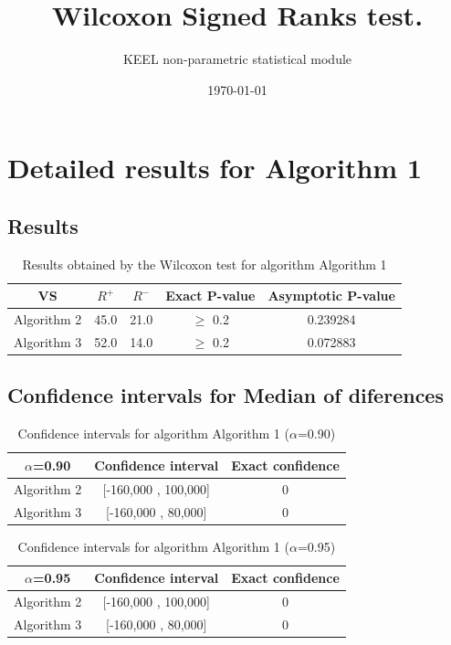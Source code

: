 \documentclass[a4paper,10pt]{article}
\title{Wilcoxon Signed Ranks test.}
\date{\today}
\author{KEEL non-parametric statistical module}
\begin{document}
\pagestyle{empty}
\maketitle
\thispagestyle{empty}



\section{Detailed results for Algorithm 1}


\subsection{Results}

\begin{table}[!htp]
\centering\small
\begin{tabular}{
|c|c|c|c|c|}
\hline
 VS & $R^{+}$ & $R^{-}$ & Exact P-value & Asymptotic P-value \\ \hline 
Algorithm 2 & 45.0 & 21.0 & $\geq$ 0.2 & 0.239284\\ \hline 
Algorithm 3 & 52.0 & 14.0 & $\geq$ 0.2 & 0.072883\\ \hline 

\end{tabular}
\caption{Results obtained by the Wilcoxon test for algorithm Algorithm 1}
\end{table}

\subsection{Confidence intervals for Median of diferences}

\begin{table}[!htp]
\centering\small
\begin{tabular}{
|c|c|c|}
\hline
 $\alpha$=0.90 & Confidence interval & Exact confidence \\ \hline 
Algorithm 2 & [-160,000 , 100,000] & 0\\ \hline 
Algorithm 3 & [-160,000 , 80,000] & 0\\ \hline 

\end{tabular}
\caption{Confidence intervals for algorithm Algorithm 1 ($\alpha$=0.90)}
\end{table}
\begin{table}[!htp]
\centering\small
\begin{tabular}{
|c|c|c|}
\hline
 $\alpha$=0.95 & Confidence interval & Exact confidence \\ \hline 
Algorithm 2 & [-160,000 , 100,000] & 0\\ \hline 
Algorithm 3 & [-160,000 , 80,000] & 0\\ \hline 

\end{tabular}
\caption{Confidence intervals for algorithm Algorithm 1 ($\alpha$=0.95)}
\end{table}
\end{document}
